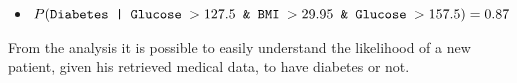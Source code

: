 \documentclass[12pt]{article}
\begin{document}
\begin{enumerate}[leftmargin=\labelsep, label=\textbf{\arabic*.)}]
\begin{enumerate}[label=\textbf{\roman*.)}]
\begin{itemize}
\begin{itemize}
\begin{itemize}
                                            \item $P( \text{\texttt{Diabetes | Glucose $> 127.5$ \& BMI $> 29.95$ \& Glucose $> 157.5$}}) = 0.87$
                                        \end{itemize}
                              \end{itemize}
                    \end{itemize}
                    \vspace{0.5em}
                    From the analysis it is possible to easily understand the likelihood of a new patient, given his retrieved medical data, to have diabetes or not.
          \end{enumerate}
\end{enumerate}
\end{document}
